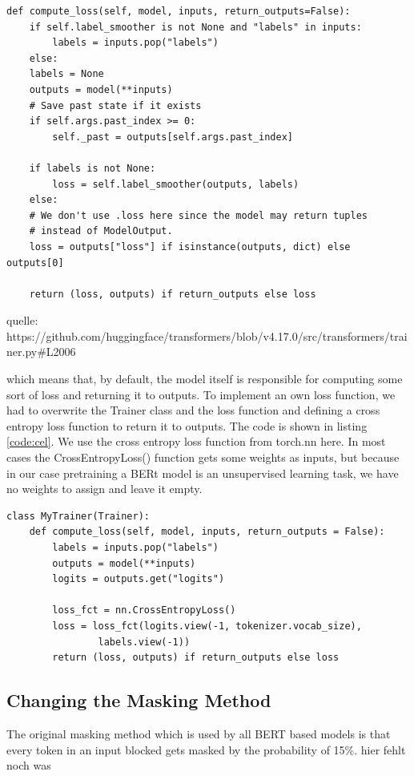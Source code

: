 \begin{code}
	\label{code:loss}
\begin{verbatim}
def compute_loss(self, model, inputs, return_outputs=False):
	if self.label_smoother is not None and "labels" in inputs:
		labels = inputs.pop("labels")
	else:
	labels = None
	outputs = model(**inputs)
	# Save past state if it exists
	if self.args.past_index >= 0:
		self._past = outputs[self.args.past_index]
	
	if labels is not None:
		loss = self.label_smoother(outputs, labels)
	else:
	# We don't use .loss here since the model may return tuples 
	# instead of ModelOutput.
	loss = outputs["loss"] if isinstance(outputs, dict) else outputs[0]
	
	return (loss, outputs) if return_outputs else loss
\end{verbatim}
\end{code}
\alert{quelle: https://github.com/huggingface/transformers/blob/v4.17.0/src/transformers/trainer.py#L2006}

which means that, by default, the model itself is responsible for computing some sort of loss and returning it to outputs. To implement an own loss function, we had to overwrite the Trainer class and the loss function and defining a cross entropy loss function to return it to outputs. The code is shown in listing \ref{code:cel}. We use the cross entropy loss function from \alert{torch.nn} here. In most cases the \alert{CrossEntropyLoss(}) function gets some weights as inputs, but because in our case pretraining a BERt model is an unsupervised learning task, we have no weights to assign and leave it empty.

\begin{code}
	\label{code:cel}
\begin{verbatim}
class MyTrainer(Trainer):
	def compute_loss(self, model, inputs, return_outputs = False):
		labels = inputs.pop("labels")
		outputs = model(**inputs)
		logits = outputs.get("logits")

		loss_fct = nn.CrossEntropyLoss()
		loss = loss_fct(logits.view(-1, tokenizer.vocab_size),
				labels.view(-1))
		return (loss, outputs) if return_outputs else loss
\end{verbatim}
\end{code}

\subsection{Changing the Masking Method}
The original masking method which is used by all BERT based models is that every token in an input blocked gets masked by the probability of 15\%. 
\alert{hier fehlt noch was}

